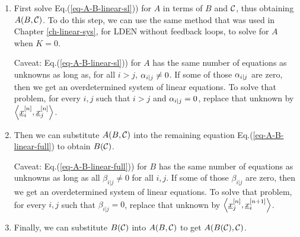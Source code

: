 \begin{enumerate}
\item First solve
Eq.(\ref{eq-A-B-linear-sl})) for $A$ in terms of $B$ and ${\cal C}$, thus obtaining $A(B,
{\cal C})$.
To do this step,
we can use the same method that was used
in Chapter \ref{ch-linear-sys},
for LDEN without feedback loops, to solve for
$A$ when $K= 0$.
 
Caveat: Eq.(\ref{eq-A-B-linear-sl})) for $A$ has the same number of equations as unknowns as long as, for all $i>j$,
$\alpha_{i|j}\neq 0$. If some of those $\alpha_{i|j}$ are zero, then we get an
overdetermined system of linear equations.
To solve that problem, for every 
$i, j$ such that $i>j$ and  $\alpha_{i|j}= 0$,
replace that unknown by $\left\langle{\underline{x}}_i^{[n]},
{\underline{x}}_j^{[n]}\right\rangle$.

\item Then we can substitute $A(B, {\cal C})$ into the remaining equation
Eq.(\ref{eq-A-B-linear-full})
to obtain $B({\cal C})$. 

Caveat: Eq.(\ref{eq-A-B-linear-full})) for $B$ has the same number of equations as unknowns as long as
all $\beta_{i|j}\neq 0$ for all $i,j$. If some of those $\beta_{i|j}$ are zero, then we get an
overdetermined system of linear equations.
To solve that problem, for every 
$i, j$ such that $\beta_{i|j}= 0$,
replace that unknown by $\left\langle{\underline{x}}_j^{[n]},
{\underline{x}}_i^{[n+1]}\right\rangle$.

\item Finally, we can substitute $B({\cal C})$ into $A(B,
{\cal C})$ to get $A(B({\cal C}), {\cal C})$.
\end{enumerate}
 
 


